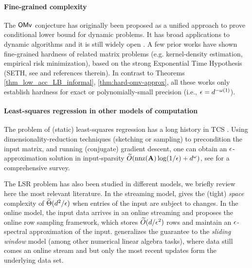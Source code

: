 \paragraph{Fine-grained complexity} The $\mathsf{OMv}$ conjecture \cite{hkns} has originally been proposed as a unified approach to prove conditional lower bound for dynamic problems. It has broad applications to dynamic algorithms \cite{d16,bks17,jns19,lr21,jx22} and it is still widely open \cite{lw17, ckl18,aggs22,hs22}.
A few prior works \cite{acss20, cs17,bis17,bcis18} have shown fine-grained hardness of related matrix problems (e.g. kernel-density estimation, empirical risk minimization), based on the strong Exponential Time Hypothesis (SETH, see  \cite{ip01} and references therein). 
In contrast to Theorems \ref{thm_low_acc_LB_informal}, \ref{thm:hard-omv-approx}, all these works only establish hardness for exact or polynomially-small precision (i.e., $\epsilon=d^{-\omega(1)}$).


\paragraph{Least-squares regression in other models of computation}
The problem of (static) least-squares regression has a long history in TCS \cite{ac06,cw17,nn13,clmmps15,acw17}. Using dimensionality-reduction techniques (sketching or sampling) to precondition the input matrix, and running (conjugate) gradient descent, one can obtain an $\epsilon$-approximation solution in input-sparsity $\widetilde{O}(\operatorname{nnz}(\mathbf{A})\log(1/\epsilon) + d^{\omega})$, see \cite{w14,w21} for a comprehensive survey.

The LSR problem has also been studied in different models, we briefly review here the most relevant literature. 
In the streaming model, \cite{cw09} gives the (tight) {\em space} complexity of $\widetilde{\Theta}(d^2/\epsilon)$ when entries of the input are subject to changes.
In the online model, the input data arrives in an online streaming and \cite{cmp20} proposes the online row sampling framework, which stores $\widetilde{O}(d/\epsilon^2)$ rows and maintain an $\epsilon$-spectral approximation of the input.
\cite{bdm+20} generalizes the guarantee to the {\em sliding window} model (among other numerical linear algebra tasks), where data still comes an online stream and but only the most recent updates form the underlying data set.

